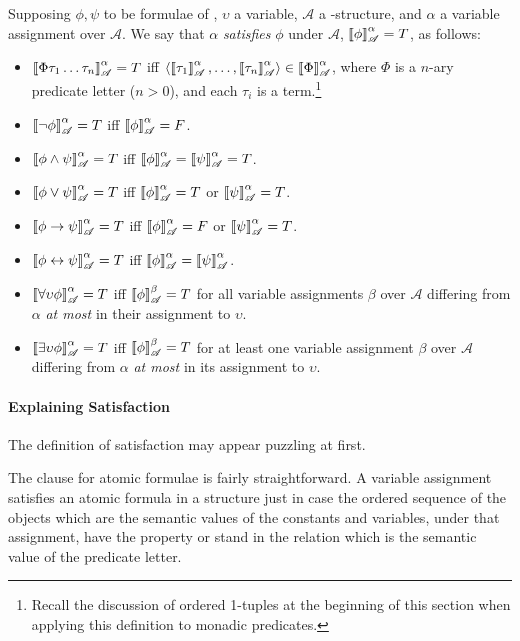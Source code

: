 \begin{definition}[Satisfaction]\label{ltwosats}
Supposing $\phi,\psi$ to be formulae of \ltwo, $\upsilon$ a variable, $\mathscr{A}$ a \ltwo-structure, and $\alpha$ a variable assignment over $\mathscr{A}$. We say that $\alpha$ \emph{satisfies} $\phi$ under $\mathscr{A}$, $\valsa{\phi}=T$, as follows: \begin{itemize}
	\item $\valsa{\Phi\tau_{1}\ldots\tau_{n}}=T$ iff $\langle \valsa{\tau_{1}},\ldots,\valsa{\tau_{n}}\rangle \in \valsa{\Phi}$, where $\Phi$ is a $n$-ary predicate letter ($n>0$), and each $\tau_{i}$ is a term.\footnote{Recall the discussion of ordered 1-tuples at the beginning of this section when applying this definition to monadic predicates.}
	\item $\valsa{\neg\phi}=T$ iff $\valsa{\phi}=F$.
	\item $\valsa{\phi\wedge\psi}=T$ iff $\valsa{\phi}=\valsa{\psi}=T$.
	\item $\valsa{\phi\vee\psi}=T$ iff $\valsa{\phi}=T$ or $\valsa{\psi}=T$.
	\item $\valsa{\phi\to\psi}=T$ iff $\valsa{\phi}=F$ or $\valsa{\psi}=T$.
	\item $\valsa{\phi\bicond\psi}=T$ iff $\valsa{\phi}=\valsa{\psi}$.
	\item $\valsa{\forall \upsilon\phi}=T$ iff $\vals{\phi}{A}{\beta}=T$ for all variable assignments $\beta$ over $\mathscr{A}$ differing from $\alpha$ \emph{at most} in their assignment to $\upsilon$.
		\item $\valsa{\exists \upsilon\phi}=T$ iff $\vals{\phi}{A}{\beta}=T$ for at least one variable assignment $\beta$ over $\mathscr{A}$ differing from $\alpha$ \emph{at most} in its assignment to $\upsilon$.
\end{itemize}
\end{definition}

\paragraph{Explaining Satisfaction}

The definition of satisfaction may appear puzzling at first.

The clause for atomic formulae is fairly straightforward. A variable assignment satisfies an atomic formula in a structure just in case the ordered sequence of the  objects which are the semantic values of the constants and variables, under that assignment, have the property or stand in the  relation which is the semantic value of the predicate letter. 

